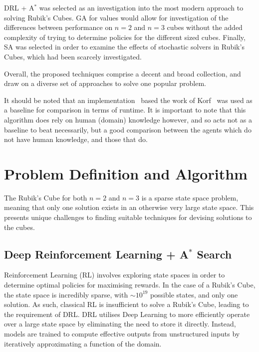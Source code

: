 \documentclass[UKenglish]{svproc}
\begin{document}
DRL + A$^{\ast}$ was selected as an investigation into the most modern approach to solving Rubik's Cubes. GA for values would allow for investigation of the differences between performance on $n=2$ and $n=3$ cubes without the added complexity of trying to determine policies for the different sized cubes. Finally, SA was selected in order to examine the effects of stochastic solvers in Rubik's Cubes, which had been scarcely investigated.

Overall, the proposed techniques comprise a decent and broad collection, and draw on a diverse set of approaches to solve one popular problem.

It should be noted that an implementation~\cite{Shoukat2019} based the work of Korf~\cite{KORF198597} was used as a baseline for comparison in terms of runtime. It is important to note that this algorithm does rely on human (domain) knowledge however, and so acts not as a baseline to beat necessarily, but a good comparison between the agents which do not have human knowledge, and those that do.


\section{Problem Definition and Algorithm}
The Rubik's Cube for both $n=2$ and $n=3$ is a sparse state space problem, meaning that only one solution exists in an otherwise very large state space. This presents unique challenges to finding suitable techniques for devising solutions to the cubes.

\subsection{Deep Reinforcement Learning + A$^{\ast}$ Search}
Reinforcement Learning (RL) involves exploring state spaces in order to determine optimal policies for maximising rewards. In the case of a Rubik's Cube, the state space is incredibly sparse, with $\sim 10^{19}$ possible states, and only one solution. As such, classical RL is insufficient to solve a Rubik's Cube, leading to the requirement of DRL. DRL utilises Deep Learning to more efficiently operate over a large state space by eliminating the need to store it directly. Instead, models are trained to compute effective outputs from unstructured inputs by iteratively approximating a function of the domain.
\end{document}

